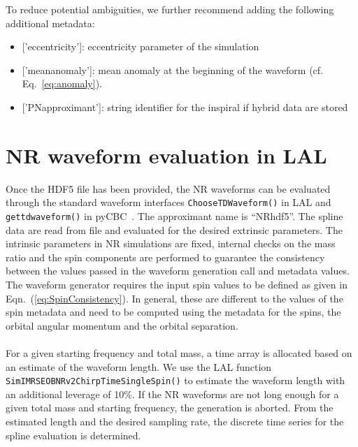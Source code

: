 \documentclass[aps,prd,amssymb,amsmath,amsfonts,superscriptaddress,
floatfix ,preprintnumbers,altaffilletter]{revtex4}
\begin{document}
To reduce potential ambiguities, we further recommend adding the following  additional metadata:
\begin{itemize}
\item{[}'eccentricity'{]}: eccentricity parameter of the simulation
\item {[}'mean\textunderscore anomaly'{]}: mean anomaly at the beginning of the waveform (cf. Eq.~\ref{eq:anomaly}).
\item{[}'PN\textunderscore approximant'{]}: string identifier for the inspiral if hybrid data are stored
\end{itemize}

\section{NR waveform evaluation in LAL}
\label{sec:gen}
Once the HDF5 file has been provided, the NR waveforms can be evaluated through the standard waveform interfaces \texttt{ChooseTDWaveform()} in LAL and \texttt{get\textunderscore td\textunderscore waveform()} in pyCBC~\cite{Canton:2014ena}. The approximant name is ``NR\textunderscore hdf5''. 
The spline data are read from file and evaluated for the desired extrinsic parameters. The intrinsic parameters in NR simulations are fixed, internal checks on the mass ratio and the spin components are performed to guarantee the consistency between the values passed in the waveform generation call and metadata values. The waveform generator requires the input spin values to be defined as given in Eqn.~(\ref{eq:SpinConsistency}). In general, these are different to the values of the spin metadata and need to be computed using the metadata for the spins, the orbital angular momentum and the orbital separation.\\
\\For a given starting frequency and total mass, a time array is allocated based on an estimate of the waveform length. We use the LAL function 
\texttt{SimIMRSEOBNRv2ChirpTimeSingleSpin()} to estimate the waveform length with an additional leverage of 10\%. If the NR waveforms are not long enough for a given total mass and starting frequency, the generation is aborted. From the estimated length and the desired sampling rate, the discrete time series for the spline evaluation is
determined.\\
\end{document}
